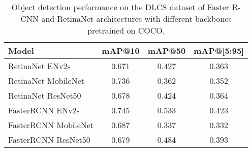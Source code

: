 \begin{table}[h]
    \centering
    \begin{tabular}{lccc}
        \hline
        \textbf{Model} & \textbf{mAP@10} & \textbf{mAP@50} & \textbf{mAP@[5:95]} \\
        \hline
        RetinaNet ENv2s      & 0.671 & 0.427 & 0.363 \\
        RetinaNet MobileNet  & 0.736 & 0.362 & 0.352 \\
        RetinaNet ResNet50   & 0.678 & 0.424 & 0.364 \\
        \rowcolor{yellow!20} 
        FasterRCNN ENv2s     & 0.745 & 0.533 & 0.423 \\
        FasterRCNN MobileNet & 0.687 & 0.337 & 0.332\\
        FasterRCNN ResNet50  & 0.679 & 0.484 & 0.393 \\
        \hline
    \end{tabular}
    \caption{Object detection performance on the DLCS dataset of Faster R-CNN and RetinaNet architectures with different backbones pretrained on COCO.}
    \label{tab:dlcs-models-not-pretrained}
\end{table}